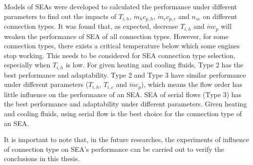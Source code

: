 Models of SEAs were developed to calculated the performance under different parameters to find out the impacts of $T_{i,h}$, $\dot{m}_hc_{p,h}$, $\dot{m}_cc_{p,c}$ and $n_{se}$ on different connection types. It was found that, as expected, decrease $T_{i,h}$ and $\dot{m}c_{p}$ will weaken the performance of SEA of all connection types. However, for some connection types, there exists a critical temperature below which some engines stop working. This needs to be considered for SEA connection type selection, especially when $T_{i,h}$ is low. For given heating and cooling fluids, Type 2 has the best performance and adaptability. Type 2 and Type 3 have similar performance under different parameters ($T_{i,h}$, $T_{i,c}$ and $\dot{m}c_p$), which means the flow order has little influence on the performance of an SEA. SEA of serial flows (Type 3) has the best performance and adaptability under different parameters. Given heating and cooling fluids, using serial flow is the best choice for the connection type of an SEA. %

It is important to note that, in the future researches, the experiments of influence of connection type on SEA's performance can be carried out to verify the conclusions in this thesis.